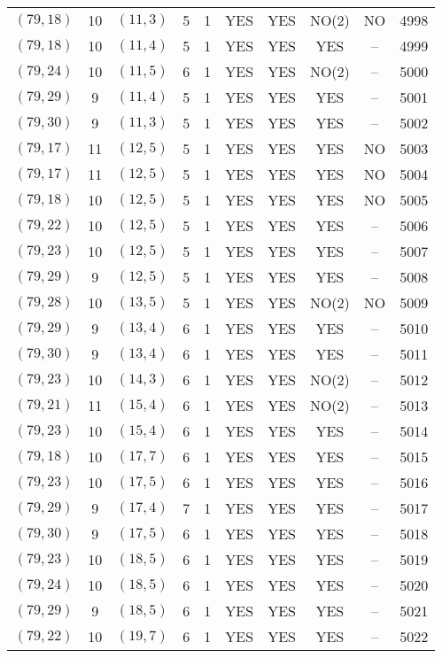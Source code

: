 \begin{longtable}{|c|c|c|c|c|c|c|c|c|c|}
$(79, 18)$ & 10 & $(11, 3)$ & 5 & 1 & YES & YES & NO(2) & NO & 4998\\
$(79, 18)$ & 10 & $(11, 4)$ & 5 & 1 & YES & YES & YES & -- & 4999\\
$(79, 24)$ & 10 & $(11, 5)$ & 6 & 1 & YES & YES & NO(2) & -- & 5000\\
$(79, 29)$ & 9 & $(11, 4)$ & 5 & 1 & YES & YES & YES & -- & 5001\\
$(79, 30)$ & 9 & $(11, 3)$ & 5 & 1 & YES & YES & YES & -- & 5002\\
$(79, 17)$ & 11 & $(12, 5)$ & 5 & 1 & YES & YES & YES & NO & 5003\\
$(79, 17)$ & 11 & $(12, 5)$ & 5 & 1 & YES & YES & YES & NO & 5004\\
$(79, 18)$ & 10 & $(12, 5)$ & 5 & 1 & YES & YES & YES & NO & 5005\\
$(79, 22)$ & 10 & $(12, 5)$ & 5 & 1 & YES & YES & YES & -- & 5006\\
$(79, 23)$ & 10 & $(12, 5)$ & 5 & 1 & YES & YES & YES & -- & 5007\\
$(79, 29)$ & 9 & $(12, 5)$ & 5 & 1 & YES & YES & YES & -- & 5008\\
$(79, 28)$ & 10 & $(13, 5)$ & 5 & 1 & YES & YES & NO(2) & NO & 5009\\
$(79, 29)$ & 9 & $(13, 4)$ & 6 & 1 & YES & YES & YES & -- & 5010\\
$(79, 30)$ & 9 & $(13, 4)$ & 6 & 1 & YES & YES & YES & -- & 5011\\
$(79, 23)$ & 10 & $(14, 3)$ & 6 & 1 & YES & YES & NO(2) & -- & 5012\\
$(79, 21)$ & 11 & $(15, 4)$ & 6 & 1 & YES & YES & NO(2) & -- & 5013\\
$(79, 23)$ & 10 & $(15, 4)$ & 6 & 1 & YES & YES & YES & -- & 5014\\
$(79, 18)$ & 10 & $(17, 7)$ & 6 & 1 & YES & YES & YES & -- & 5015\\
$(79, 23)$ & 10 & $(17, 5)$ & 6 & 1 & YES & YES & YES & -- & 5016\\
$(79, 29)$ & 9 & $(17, 4)$ & 7 & 1 & YES & YES & YES & -- & 5017\\
$(79, 30)$ & 9 & $(17, 5)$ & 6 & 1 & YES & YES & YES & -- & 5018\\
$(79, 23)$ & 10 & $(18, 5)$ & 6 & 1 & YES & YES & YES & -- & 5019\\
$(79, 24)$ & 10 & $(18, 5)$ & 6 & 1 & YES & YES & YES & -- & 5020\\
$(79, 29)$ & 9 & $(18, 5)$ & 6 & 1 & YES & YES & YES & -- & 5021\\
$(79, 22)$ & 10 & $(19, 7)$ & 6 & 1 & YES & YES & YES & -- & 5022\\

\end{longtable}
